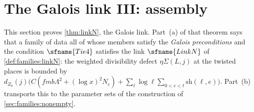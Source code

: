 \section{The Galois link III: assembly}\label{sec:pf:linkN}

\providecommand{\linkNup}{M^{\mathrm{up}}}
\providecommand{\linkNlow}{M^{\mathrm{low}}}
\providecommand{\linkNeS}{\eta\Sigma}
\providecommand{\linkNloc}{\eta_{\mathrm{loc}}}
\providecommand{\linkNvcc}{v_{\mathrm{cc}}}
\providecommand{\linkNmult}{\mathrm{mult}}
\providecommand{\linkNgood}{Z^{\mathrm{good}}}
\providecommand{\linkNdZ}{d_{Z_0}}
\providecommand{\linkNlw}{\mathrm{lw}}
\providecommand{\linkNs}{s_\Pi}
\providecommand{\linkNfin}{\mathrm{Fin}_{\Sha}}

This section proves \cref{thm:linkN}, the Galois link. Part~(a) of that theorem says that a family of data all of
whose members satisfy the \emph{Galois preconditions} and the condition $\sfname{Tie4}$ satisfies the link
$\sfname{LinkN}$ of \cref{def:families:linkN}: the weighted divisibility defect $\linkNeS(L,j)$ at the twisted places is
bounded by $\linkNdZ(j)\bigl(C(fmb\Lambda^2+(\log x)^2N_c)+\sum_\ell\log\ell\sum_{0<e<t}\mathrm{sh}(\ell,e)\bigr)$.
Part~(b) transports this to the parameter sets of the construction of \cref{sec:families:nonempty}.

